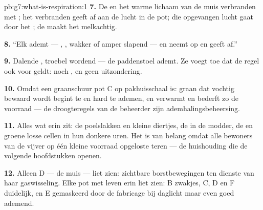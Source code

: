 \begin{solution}{pb:g7:what-is-respiration:1}
\textbf{7.} De  en het warme lichaam van de muis verbranden
 met ; het verbranden geeft  af aan
de lucht in de pot; die opgevangen lucht gaat door het ; de
 maakt het melkachtig.

\textbf{8.} ``Elk  ademt --- , ,  wakker of
amper slapend --- en neemt  op en geeft  af.''

\textbf{9.} Dalende , troebel wordend  --- de
paddenstoel ademt. Ze voegt toe dat de regel ook voor  geldt:
 noch , en geen uitzondering.

\textbf{10.} Omdat een graanschuur pot C op pakhuisschaal is: graan dat
vochtig bewaard wordt begint te  en hard te ademen, en verwarmt en
bederft zo de voorraad --- de droogteregels van de beheerder zijn
ademhalingsbeheersing.

\textbf{11.} Alles wat erin zit: de poelslakken en kleine diertjes, de
 in de modder, de  en groene losse cellen in hun donkere
uren. Het is van belang omdat alle bewoners van de vijver op één kleine
voorraad opgeloste  teren --- de huishouding die de volgende
hoofdstukken openen.

\textbf{12.} Alleen D --- de muis --- liet  zien: zichtbare
borstbewegingen ten dienste van haar gaswisseling. Elke pot met leven
erin liet  zien: B zwakjes, C, D en F duidelijk, en E gemaskeerd
door de fabricage bij daglicht maar even goed ademend.
\end{solution}
